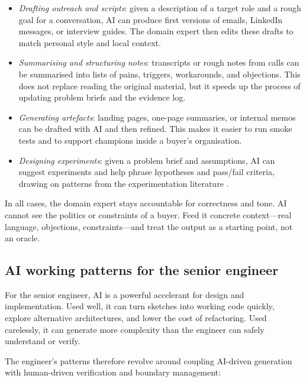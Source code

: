 \documentclass[10pt, a4paper, twocolumn]{article} %
\begin{document}
\begin{itemize}
  \item \emph{Drafting outreach and scripts}: given a description of a target role and a rough goal for a conversation, AI can produce first versions of emails, LinkedIn messages, or interview guides. The domain expert then edits these drafts to match personal style and local context.
  \item \emph{Summarising and structuring notes}: transcripts or rough notes from calls can be summarised into lists of pains, triggers, workarounds, and objections. This does not replace reading the original material, but it speeds up the process of updating problem briefs and the evidence log.
  \item \emph{Generating artefacts}: landing pages, one-page summaries, or internal memos can be drafted with AI and then refined. This makes it easier to run smoke tests and to support champions inside a buyer’s organisation.
  \item \emph{Designing experiments}: given a problem brief and assumptions, AI can suggest experiments and help phrase hypotheses and pass/fail criteria, drawing on patterns from the experimentation literature \citep{bland2019testing}.
\end{itemize}

In all cases, the domain expert stays accountable for correctness and tone. AI cannot see the politics or constraints of a buyer. Feed it concrete context—real language, objections, constraints—and treat the output as a starting point, not an oracle.

\newpage

\subsection{AI working patterns for the senior engineer}

For the senior engineer, AI is a powerful accelerant for design and implementation. Used well, it can turn sketches into working code quickly, explore alternative architectures, and lower the cost of refactoring. Used carelessly, it can generate more complexity than the engineer can safely understand or verify.

The engineer’s patterns therefore revolve around coupling AI-driven generation with human-driven verification and boundary management:
\end{document}
